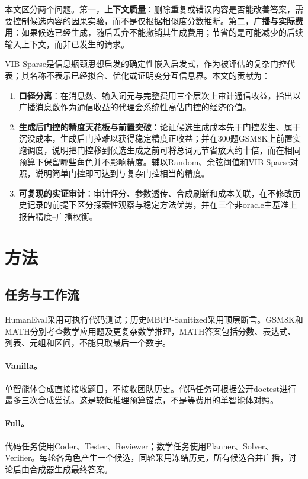 \documentclass[11pt,a4paper]{article}
\begin{document}
本文区分两个问题。第一，\textbf{上下文质量}：删除重复或错误内容是否能改善答案，需要控制候选内容的因果实验，而不是仅根据相似度分数推断。第二，\textbf{广播与实际费用}：如果候选已经生成，随后丢弃不能撤销其生成费用；节省的是可能减少的后续输入上下文，而非已发生的请求。

VIB-Sparse是信息瓶颈思想启发的确定性嵌入启发式，作为被评估的复杂门控代表；其名称不表示已经拟合、优化或证明变分互信息界。本文的贡献为：
\begin{enumerate}
\item \textbf{口径分离}：在消息数、输入词元与完整费用三个层次上审计通信收益，指出以广播消息数作为通信收益的代理会系统性高估门控的经济价值。
\item \textbf{生成后门控的精度天花板与前置突破}：论证候选生成成本先于门控发生、属于沉没成本，生成后门控难以获得稳定精度正收益；并在300题GSM8K上前置实跑调度，说明把门控移到候选生成之前可将总词元节省放大约十倍，而在相同预算下保留哪些角色并不影响精度。辅以Random、余弦阈值和VIB-Sparse对照，说明简单门控即可达到与复杂门控相当的精度。
\item \textbf{可复现的实证审计}：审计评分、参数透传、合成刷新和成本关联，在不修改历史记录的前提下区分探索性观察与稳定方法优势，并在三个非oracle主基准上报告精度--广播权衡。
\end{enumerate}

\section{方法}
\subsection{任务与工作流}
HumanEval采用可执行代码测试\citep{chen2021evaluating}；历史MBPP-Sanitized采用顶层断言\citep{austin2021program}。GSM8K和MATH分别考查数学应用题及更复杂数学推理\citep{hendrycks2021gsm8k,hendrycks2021math}，MATH答案包括分数、表达式、列表、元组和区间，不能只取最后一个数字。

\paragraph{Vanilla。}
单智能体合成直接接收题目，不接收团队历史。代码任务可根据公开doctest进行最多三次合成尝试。这是较低推理预算锚点，不是等费用的单智能体对照。

\paragraph{Full。}
代码任务使用Coder、Tester、Reviewer；数学任务使用Planner、Solver、Verifier。每轮各角色产生一个候选，同轮采用冻结历史，所有候选合并广播，讨论后由合成器生成最终答案。
\end{document}

